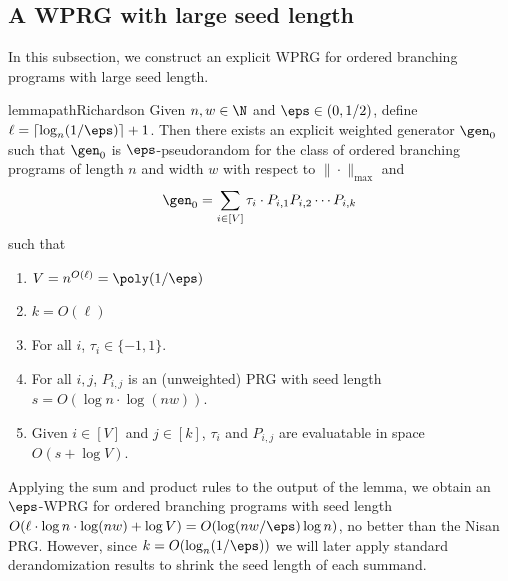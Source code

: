 \subsection{A WPRG with large seed length}
In this subsection, we construct an explicit WPRG for ordered branching programs with large seed length.
\begin{restatable}{lemma}{pathRichardson}\label{lem:pathRichardson}
Given $n,w \in \N$ and $\eps \in (0,1/2)$, define $\ell=\lceil \log_{n}(1/\eps)\rceil+1$. Then there exists an explicit weighted generator $\gen_0$ such that $\gen_0$ is $\eps$-pseudorandom for the class of ordered branching programs of length $n$ and width $w$ with respect to $\|\cdot\|_{\max}$ and
\[\gen_0 = \sum_{i\in [V]}\tau_i\cdot P_{i,1}P_{i,2}\cdots P_{i,k}\]
such that %
\begin{enumerate}
    \item $V=n^{O(\ell)}=\poly(1/\eps)$
    \item $k=O(\ell)$
    \item For all $i$, $\tau_i\in \{-1,1\}$.
    \item For all $i,j$, $P_{i,j}$ is an (unweighted) PRG with seed length $s=O(\log n \cdot\log(nw))$.
    \item Given $i\in [V]$ and $j\in [k]$, $\tau_i$ and $P_{i,j}$ are evaluatable in space $O(s+\log V)$.
\end{enumerate}
\end{restatable}
Applying the sum and product rules to the output of the lemma, we obtain an $\eps$-WPRG for ordered branching programs with seed length $O(\ell\cdot \log n\cdot\log(nw)+\log V)=O(\log(nw/\eps)\log n)$, no better than the Nisan PRG. However, since $k=O(\log_{n}(1/\eps))$ we will later apply standard derandomization results to shrink the seed length of each summand.

